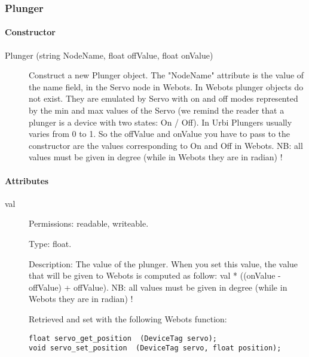 \subsubsection{Plunger}
\label{webots.uobjects.robotdevices.plunger}%

\paragraph{Constructor}
\label{webots.uobjects.robotdevices.plunger.constructor}%

\noindent
\begin{description}
\item[{Plunger (string NodeName, float offValue, float onValue)}]
  Construct a new Plunger object. The "NodeName" attribute is the
  value of the name field, in the Servo node in Webots. In Webots
  plunger objects do not exist. They are emulated by Servo with on and
  off modes represented by the min and max values of the Servo (we
  remind the reader that a plunger is a device with two states: On /
  Off). In Urbi Plungers usually varies from 0 to 1. So the offValue
  and onValue you have to pass to the constructor are the values
  corresponding to On and Off in Webots. NB: all values must be given
  in degree (while in Webots they are in radian) !

\end{description}

\paragraph{Attributes}
\label{webots.uobjects.robotdevices.plunger.attributes}%

\noindent
\begin{description}
\item[{         val
 }]            Permissions: readable, writeable.


 Type: float.


 Description: The value of the plunger. When you set this value, the
 value that will be given to Webots is computed as follow: val *
 ((onValue -{} offValue) + offValue).  NB: all values must be given in
 degree (while in Webots they are in radian) !


          Retrieved and set with the following Webots function:


\begin{lstlisting}
float servo_get_position  (DeviceTag servo);
void servo_set_position  (DeviceTag servo, float position);
\end{lstlisting}
\end{description}

